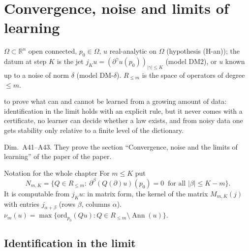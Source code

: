 \documentclass[11pt,a4paper,oneside]{report}
\newcommand{\chapterbrief}[3]{\begin{leadin}\begin{description}[itemsep=3pt,leftmargin=3.1cm,labelwidth=2.9cm,font=\sffamily\bfseries\small]
  \item[Starting from] #1
  \item[Why] #2
  \item[Role] #3
  \end{description}\end{leadin}}
\newcommand{\R}{\mathbb{R}}\newcommand{\C}{\mathbb{C}}\newcommand{\N}{\mathbb{N}}\newcommand{\Z}{\mathbb{Z}}\newcommand{\Q}{\mathbb{Q}}
\newcommand{\Ann}{\operatorname{Ann}}
\begin{document}


\chapter[Convergence and noise]{Convergence, noise and limits of learning}\label{ch:cIII3}
\chapterbrief
{$\Omega\subset\R^n$ open connected, $p_0\in\Omega$, $u$ real-analytic on $\Omega$ (hypothesis (H-an)); the datum at step $K$ is the jet $j_Ku=(\partial^\gamma u(p_0))_{|\gamma|\le K}$ (model DM2), or $u$ known up to a noise of norm $\delta$ (model DM-$\delta$). $R_{\le m}$ is the space of operators of degree $\le m$.}
{to prove what can and cannot be learned from a growing amount of data: identification in the limit holds with an explicit rule, but it never comes with a certificate, no learner can decide whether a law exists, and from noisy data one gets stability only relative to a finite level of the dictionary.}
{Dim.~A41--A43. They prove the section ``Convergence, noise and the limits of learning'' of the paper of the paper.}

\begin{notebox}{Notation for the whole chapter}
For $m\le K$ put
\[
N_{m,K}=\{Q\in R_{\le m}:\ \partial^\beta(Q(\partial)u)(p_0)=0\ \text{ for all }|\beta|\le K-m\}.
\]
It is computable from $j_Ku$: in matrix form, the kernel of the matrix $M_{m,K}(j)$ with entries $j_{\alpha+\beta}$ (rows $\beta$, columns $\alpha$). $\nu_m(u)=\max\{\mathrm{ord}_{p_0}(Qu):Q\in R_{\le m}\setminus\Ann(u)\}$.
\end{notebox}

\section{Identification in the limit}
\end{document}
